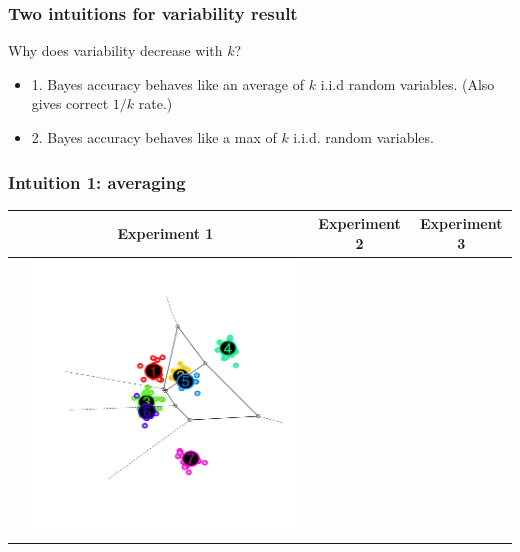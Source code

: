 \documentclass{beamer}
\begin{document}
\begin{frame}
\frametitle{Two intuitions for variability result}
Why does variability decrease with $k$?
\begin{itemize}
\item 1. Bayes accuracy behaves like an average of $k$ i.i.d random variables. (Also gives correct $1/k$ rate.)
\item 2. Bayes accuracy behaves like a max of $k$ i.i.d. random variables.
\end{itemize}
\end{frame}

\begin{frame}
\frametitle{Intuition 1: averaging}
\begin{center}
\begin{tabular}{c|c|c|c}
& Experiment 1 & Experiment 2 & Experiment 3\\\hline
&\includegraphics[scale = 0.15, clip = true, trim = 0.6in 0.2in 0.6in 0.2in]{../info_theory_paper/gaussian_figure1a.png} &

\end{tabular}
\end{center}
\end{frame}
\end{document}
